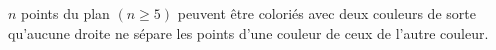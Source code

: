 $n$ points du plan $(n \geq 5)$ peuvent être coloriés avec deux couleurs de sorte qu'aucune droite ne sépare les points d'une couleur de ceux de l'autre couleur.
